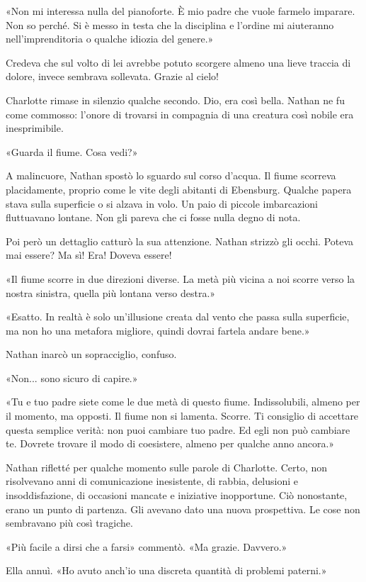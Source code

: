 \documentclass[a4paper,oneside,11pt]{memoir}
\begin{document}
«Non mi interessa nulla del pianoforte. È mio padre che vuole farmelo imparare.
Non so perché. Si è messo in testa che la disciplina e l'ordine mi aiuteranno
nell'imprenditoria o qualche idiozia del genere.»

Credeva che sul volto di lei avrebbe potuto scorgere almeno una lieve traccia di
dolore, invece sembrava sollevata. Grazie al cielo!

Charlotte rimase in silenzio qualche secondo. Dio, era così bella. Nathan ne fu
come commosso: l'onore di trovarsi in compagnia di una creatura così nobile era
inesprimibile.

«Guarda il fiume. Cosa vedi?»

A malincuore, Nathan spostò lo sguardo sul corso d'acqua. Il fiume scorreva
placidamente, proprio come le vite degli abitanti di Ebensburg. Qualche papera
stava sulla superficie o si alzava in volo. Un paio di piccole imbarcazioni
fluttuavano lontane. Non gli pareva che ci fosse nulla degno di nota.

Poi però un dettaglio catturò la sua attenzione. Nathan strizzò gli occhi.
Poteva mai essere? Ma sì! Era! Doveva essere!

«Il fiume scorre in due direzioni diverse. La metà più vicina a noi scorre verso
la nostra sinistra, quella più lontana verso destra.»

«Esatto. In realtà è solo un'illusione creata dal vento che passa sulla
superficie, ma non ho una metafora migliore, quindi dovrai fartela andare bene.»

Nathan inarcò un sopracciglio, confuso.

«Non... sono sicuro di capire.»

«Tu e tuo padre siete come le due metà di questo fiume. Indissolubili, almeno
per il momento, ma opposti. Il fiume non si lamenta. Scorre. Ti consiglio di
accettare questa semplice verità: non puoi cambiare tuo padre. Ed egli non può
cambiare te. Dovrete trovare il modo di coesistere, almeno per qualche anno
ancora.»

Nathan rifletté per qualche momento sulle parole di Charlotte. Certo, non
risolvevano anni di comunicazione inesistente, di rabbia, delusioni e
insoddisfazione, di occasioni mancate e iniziative inopportune. Ciò nonostante,
erano un punto di partenza. Gli avevano dato una nuova prospettiva. Le cose non
sembravano più così tragiche.

«Più facile a dirsi che a farsi» commentò. «Ma grazie. Davvero.»

Ella annuì. «Ho avuto anch'io una discreta quantità di problemi paterni.»
\end{document}
